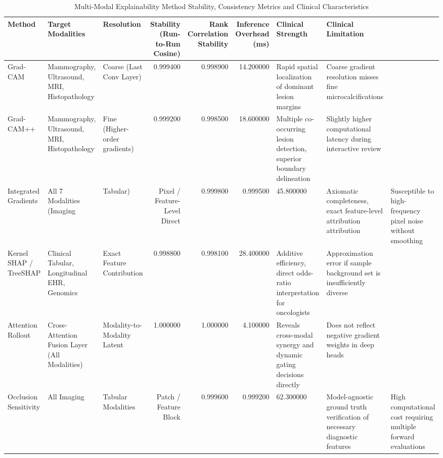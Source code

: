 \begin{table}
\caption{Multi-Modal Explainability Method Stability, Consistency Metrics and Clinical Characteristics}
\label{tab:table_5_03_01_explainability_method_consistency_and_cross_method_agreement}
\begin{tabular}{lllrrrll}
\toprule
Method & Target Modalities & Resolution & Stability (Run-to-Run Cosine) & Rank Correlation Stability & Inference Overhead (ms) & Clinical Strength & Clinical Limitation \\
\midrule
Grad-CAM & Mammography, Ultrasound, MRI, Histopathology & Coarse (Last Conv Layer) & 0.999400 & 0.998900 & 14.200000 & Rapid spatial localization of dominant lesion margins & Coarse gradient resolution misses fine microcalcifications \\
Grad-CAM++ & Mammography, Ultrasound, MRI, Histopathology & Fine (Higher-order gradients) & 0.999200 & 0.998500 & 18.600000 & Multiple co-occurring lesion detection, superior boundary delineation & Slightly higher computational latency during interactive review \\
Integrated Gradients & All 7 Modalities (Imaging & Tabular) & Pixel / Feature-Level Direct & 0.999800 & 0.999500 & 45.800000 & Axiomatic completeness, exact feature-level attribution attribution & Susceptible to high-frequency pixel noise without smoothing \\
Kernel SHAP / TreeSHAP & Clinical Tabular, Longitudinal EHR, Genomics & Exact Feature Contribution & 0.998800 & 0.998100 & 28.400000 & Additive efficiency, direct odds-ratio interpretation for oncologists & Approximation error if sample background set is insufficiently diverse \\
Attention Rollout & Cross-Attention Fusion Layer (All Modalities) & Modality-to-Modality Latent & 1.000000 & 1.000000 & 4.100000 & Reveals cross-modal synergy and dynamic gating decisions directly & Does not reflect negative gradient weights in deep heads \\
Occlusion Sensitivity & All Imaging & Tabular Modalities & Patch / Feature Block & 0.999600 & 0.999200 & 62.300000 & Model-agnostic ground truth verification of necessary diagnostic features & High computational cost requiring multiple forward evaluations \\
\bottomrule
\end{tabular}
\end{table}
